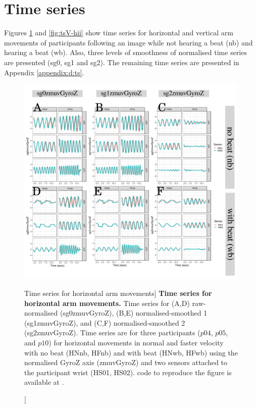 \section{Time series}
Figures \ref{fig:tsH-hii} and \ref{fig:tsV-hii} show time series for 
horizontal and vertical arm movements of participants 
following an image while not hearing a beat (nb) and hearing a beat (wb).
Also, three levels of smoothness of normalised time series are presented
 (sg0, sg1 and sg2).
The remaining time series are presented in Appendix \ref{appendix:d:ts}.
\begin{figure}
\centering
\includegraphics[width=0.99\textwidth]{fig_5_01}
    	\caption
	[Time series for horizontal arm movements]{
	{\bf Time series for horizontal arm movements.}
		Time series for (A,D) raw-normalised (sg0zmuvGyroZ), 
		(B,E) normalised-smoothed 1 (sg1zmuvGyroZ), and
		(C,F) normalised-smoothed 2 (sg2zmuvGyroZ).
		Time series are for three participants 
		($p04$, $p05$, and $p10$) 
		for horizontal movements in normal and faster velocity with
		no beat	(HNnb, HFnb) and with beat (HNwb, HFwb) using 
		the normalised GyroZ axis (zmuvGyroZ) and 
		two sensors attached to the participant wrist (HS01, HS02).
	\R code to reproduce the figure is available at 
	.
        }
    \label{fig:tsH-hii}
\end{figure}

